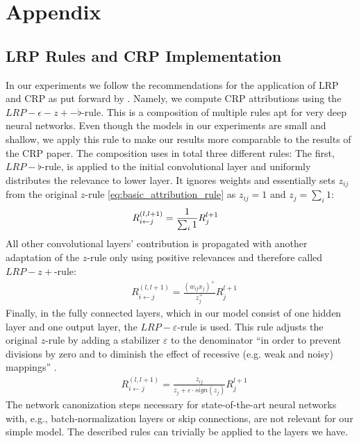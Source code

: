 \chapter{Appendix}\label{chapter:Appendix}

\section{LRP Rules and CRP Implementation}
\label{appendix:lrprules}
In our experiments we follow the recommendations for the application of LRP and CRP as put forward by \cite{Bach2015, Kohlbrenner2020, Montavon2019, Samek2021}. Namely, we compute CRP attributions using the $LRP-\epsilon-z+-\flat$-rule. This is a composition of multiple rules apt for very deep neural networks. Even though the models in our experiments are small and shallow, we apply this rule to make our results more comparable to the results of the CRP paper. The composition uses in total three different rules: The first, $LRP-\flat$-rule, is applied to the initial convolutional layer and uniformly distributes the relevance to lower layer. It ignores weights and essentially sets $z_{ij}$ from the original $z$-rule \cref{eq:basic_attribution_rule} as $z_{ij} = 1$ and $z_j = \sum_i 1$: 
\begin{align}\displaystyle
& R_{i\leftarrow j}^{(l, l+1)} = \frac{1}{\sum_{i}1} R_{j}^{l+1}
\end{align}
All other convolutional layers' contribution is propagated with another adaptation of the $z$-rule only using positive relevances and therefore called $LRP-z+$-rule:
\begin{align}
& R_{i\leftarrow j}^{(l, l+1)} = \frac{(w_{ij}x_j)^{+}}{z_{j}^+} R_{j}^{l+1}
\end{align}
Finally, in the fully connected layers, which in our model consist of one hidden layer and one output layer, the $LRP-\varepsilon$-rule is used. This rule adjusts the original $z$-rule by adding a stabilizer $\varepsilon$ to the denominator ``in order to prevent divisions by zero and to diminish the effect of recessive (e.g. weak and noisy) mappings'' \citep[][p. 2]{Kohlbrenner2020}. 
\begin{align}
& R_{i\leftarrow j}^{(l, l+1)} = \frac{z_{ij}}{z_{j} + \varepsilon \cdot sign(z_j)} R_{j}^{l+1}
\end{align}
The network canonization steps necessary for state-of-the-art neural networks with, e.g., batch-normalization layers or skip connections, are not relevant for our simple model. The described rules can trivially be applied to the layers we have. 

